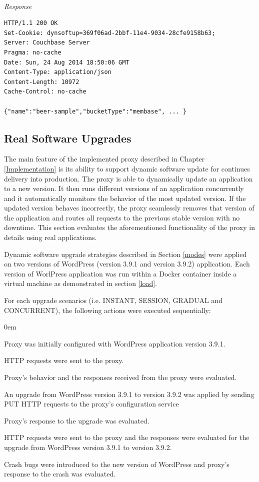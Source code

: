 \documentclass[a4paper,11pt,twoside]{report}
\begin{document}
\noindent\\
\textit{Response}
\begin{lstlisting}[language=terminal]
HTTP/1.1 200 OK
Set-Cookie: dynsoftup=369f06ad-2bbf-11e4-9034-28cfe9158b63;
Server: Couchbase Server
Pragma: no-cache
Date: Sun, 24 Aug 2014 18:50:06 GMT
Content-Type: application/json
Content-Length: 10972
Cache-Control: no-cache

{"name":"beer-sample","bucketType":"membase", ... }
\end{lstlisting}

\subsection{Real Software Upgrades}
The main feature of the implemented proxy described in Chapter \ref{Implementation} is its ability to support dynamic software update for continues delivery into production. The proxy is able to dynamically update an application to a new version. It then runs different versions of an application concurrently and it automatically monitors the behavior of the most updated version. If the updated version behaves incorrectly, the proxy seamlessly removes that version of the application and routes all requests to the previous stable version with no downtime. This section evaluates the aforementioned functionality of the proxy in details using real applications.

Dynamic software upgrade strategies described in Section \ref{modes} were applied on two versions of WordPress (version 3.9.1 and version 3.9.2) application. Each version of WorlPress application was run within a Docker container inside a virtual machine as demonstrated in section \ref{load}.

For each upgrade scenarios (i.e. INSTANT, SESSION, GRADUAL and CONCURRENT), the following actions were executed sequentially:

\begin{list}{-}{}
  \itemsep0em
  \item Proxy was initially configured with WordPress application version 3.9.1. 
  \item HTTP requests were sent to the proxy.
  \item Proxy's behavior and the responses received from the proxy  were evaluated. 
  \item An upgrade from WordPress version 3.9.1 to version 3.9.2 was applied by sending PUT HTTP requests to the proxy's configuration service
  \item Proxy's response to the upgrade was evaluated.
  \item HTTP requests were sent to the proxy and the responses were evaluated for the upgrade from WordPress version 3.9.1 to version 3.9.2.
  \item Crash bugs were introduced to the new version of WordPress and proxy's response to the crash was evaluated.
\end{list} 
\end{document}

